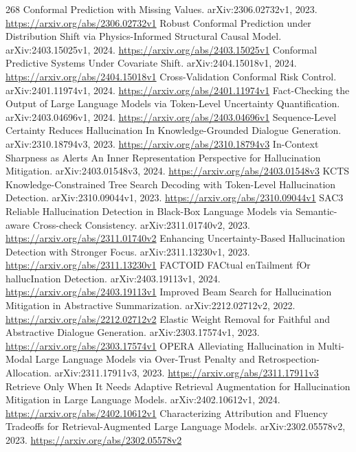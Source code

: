 \documentclass[11pt]{article}
\begin{document}
\begin{thebibliography}{268}
 Conformal Prediction with Missing Values. arXiv:2306.02732v1, 2023. \url{https://arxiv.org/abs/2306.02732v1}
 Robust Conformal Prediction under Distribution Shift via Physics-Informed Structural Causal Model. arXiv:2403.15025v1, 2024. \url{https://arxiv.org/abs/2403.15025v1}
 Conformal Predictive Systems Under Covariate Shift. arXiv:2404.15018v1, 2024. \url{https://arxiv.org/abs/2404.15018v1}
 Cross-Validation Conformal Risk Control. arXiv:2401.11974v1, 2024. \url{https://arxiv.org/abs/2401.11974v1}
 Fact-Checking the Output of Large Language Models via Token-Level Uncertainty Quantification. arXiv:2403.04696v1, 2024. \url{https://arxiv.org/abs/2403.04696v1}
 Sequence-Level Certainty Reduces Hallucination In Knowledge-Grounded Dialogue Generation. arXiv:2310.18794v3, 2023. \url{https://arxiv.org/abs/2310.18794v3}
 In-Context Sharpness as Alerts An Inner Representation Perspective for Hallucination Mitigation. arXiv:2403.01548v3, 2024. \url{https://arxiv.org/abs/2403.01548v3}
 KCTS Knowledge-Constrained Tree Search Decoding with Token-Level Hallucination Detection. arXiv:2310.09044v1, 2023. \url{https://arxiv.org/abs/2310.09044v1}
 SAC3 Reliable Hallucination Detection in Black-Box Language Models via Semantic-aware Cross-check Consistency. arXiv:2311.01740v2, 2023. \url{https://arxiv.org/abs/2311.01740v2}
 Enhancing Uncertainty-Based Hallucination Detection with Stronger Focus. arXiv:2311.13230v1, 2023. \url{https://arxiv.org/abs/2311.13230v1}
 FACTOID FACtual enTailment fOr hallucInation Detection. arXiv:2403.19113v1, 2024. \url{https://arxiv.org/abs/2403.19113v1}
 Improved Beam Search for Hallucination Mitigation in Abstractive Summarization. arXiv:2212.02712v2, 2022. \url{https://arxiv.org/abs/2212.02712v2}
 Elastic Weight Removal for Faithful and Abstractive Dialogue Generation. arXiv:2303.17574v1, 2023. \url{https://arxiv.org/abs/2303.17574v1}
 OPERA Alleviating Hallucination in Multi-Modal Large Language Models via Over-Trust Penalty and Retrospection-Allocation. arXiv:2311.17911v3, 2023. \url{https://arxiv.org/abs/2311.17911v3}
 Retrieve Only When It Needs Adaptive Retrieval Augmentation for Hallucination Mitigation in Large Language Models. arXiv:2402.10612v1, 2024. \url{https://arxiv.org/abs/2402.10612v1}
 Characterizing Attribution and Fluency Tradeoffs for Retrieval-Augmented Large Language Models. arXiv:2302.05578v2, 2023. \url{https://arxiv.org/abs/2302.05578v2}

\end{thebibliography}
\end{document}
